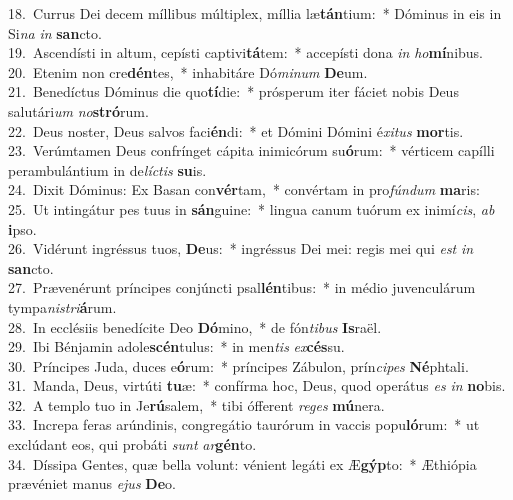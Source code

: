 {18.~}Currus Dei decem míllibus múltiplex, míllia læ\textbf{tán}tium:~* Dóminus in eis in Si\textit{na} \textit{in} \textbf{san}cto.\\
{19.~}Ascendísti in altum, cepísti captivi\textbf{tá}tem:~* accepísti dona \textit{in} \textit{ho}\textbf{mí}nibus.\\
{20.~}Etenim non cre\textbf{dén}tes,~* inhabitáre Dó\textit{mi}\textit{num} \textbf{De}um.\\
{21.~}Benedíctus Dóminus die quo\textbf{tí}die:~* prósperum iter fáciet nobis Deus salutári\textit{um} \textit{no}\textbf{stró}rum.\\
{22.~}Deus noster, Deus salvos faci\textbf{én}di:~* et Dómini Dómini é\textit{xi}\textit{tus} \textbf{mor}tis.\\
{23.~}Verúmtamen Deus confrínget cápita inimicórum su\textbf{ó}rum:~* vérticem capílli perambulántium in de\textit{lí}\textit{ctis} \textbf{su}is.\\
{24.~}Dixit Dóminus: Ex Basan con\textbf{vér}tam,~* convértam in pro\textit{fún}\textit{dum} \textbf{ma}ris:\\
{25.~}Ut intingátur pes tuus in \textbf{sán}guine:~* lingua canum tuórum ex inimí\textit{cis}, \textit{ab} \textbf{i}pso.\\
{26.~}Vidérunt ingréssus tuos, \textbf{De}us:~* ingréssus Dei mei: regis mei qui \textit{est} \textit{in} \textbf{san}cto.\\
{27.~}Prævenérunt príncipes conjúncti psal\textbf{lén}tibus:~* in médio juvenculárum tympa\textit{ni}\textit{stri}\textbf{á}rum.\\
{28.~}In ecclésiis benedícite Deo \textbf{Dó}mino,~* de fón\textit{ti}\textit{bus} \textbf{Is}raël.\\
{29.~}Ibi Bénjamin adole\textbf{scén}tulus:~* in men\textit{tis} \textit{ex}\textbf{cés}su.\\
{30.~}Príncipes Juda, duces e\textbf{ó}rum:~* príncipes Zábulon, prín\textit{ci}\textit{pes} \textbf{Né}phtali.\\
{31.~}Manda, Deus, virtúti \textbf{tu}æ:~* confírma hoc, Deus, quod operátus \textit{es} \textit{in} \textbf{no}bis.\\
{32.~}A templo tuo in Je\textbf{rú}salem,~* tibi ófferent \textit{re}\textit{ges} \textbf{mú}nera.\\
{33.~}Increpa feras arúndinis, congregátio taurórum in vaccis popu\textbf{ló}rum:~* ut exclúdant eos, qui probáti \textit{sunt} \textit{ar}\textbf{gén}to.\\
{34.~}Díssipa Gentes, quæ bella volunt: vénient legáti ex Æ\textbf{gýp}to:~* Æthiópia prævéniet manus \textit{e}\textit{jus} \textbf{De}o.\\
